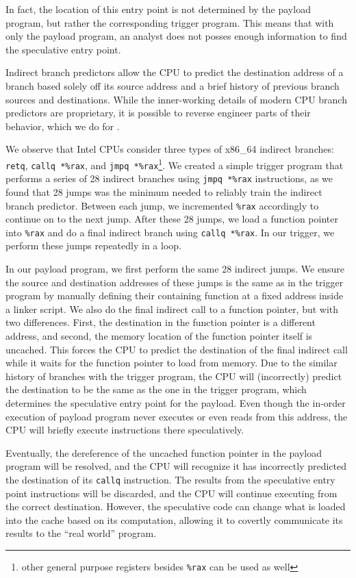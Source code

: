 In fact, the location of this entry point is not determined by the payload
program, but rather the corresponding trigger program. This means that with only
the payload program, an analyst does not posses enough information to find the
speculative entry point.



Indirect branch predictors allow the CPU to predict the destination address of a
branch based solely off its source address and a brief history of previous
branch sources and destinations. While the inner-working details of modern CPU
branch predictors are proprietary, it is possible to reverse engineer parts of
their behavior, which we do for \speculake.

We observe that Intel CPUs consider three types of x86\_64 indirect branches:
\texttt{retq}, \texttt{callq *\%rax}, and \texttt{jmpq *\%rax}\footnote{other
general purpose registers besides \texttt{\%rax} can be used as well}.
We created a simple trigger program that performs a series of 28 indirect
branches
using \texttt{jmpq *\%rax} instructions, as we found that 28 jumps was the minimum
needed to reliably train the indirect branch predictor. 
Between each jump, we incremented
\texttt{\%rax} accordingly to continue on to the next jump. After these 28
jumps, we load a function pointer into \texttt{\%rax} and do a final indirect
branch using \texttt{callq *\%rax}. In our trigger, we perform these jumps
        repeatedly in a loop.

In our payload program, we first perform the same 28 indirect jumps. We ensure
the source and destination addresses of these jumps is the same as in the trigger program by
manually defining their containing function at a fixed address inside a linker
script. We also do the final indirect call to a function pointer, but with two
differences. First, the destination in the function pointer is a different
address, and second, the memory location of the function pointer itself is uncached.
This forces the CPU to predict the destination of the final indirect call while it
waits for the function pointer to load from memory. Due to the similar
history of branches with the trigger program,
the CPU will (incorrectly) predict the destination to be the same as the one in
the trigger program, which determines the speculative entry point for the
payload. Even though the in-order execution of
payload program never executes or even reads from this address, the CPU will
briefly execute instructions there speculatively.

Eventually, the dereference of the uncached function pointer in the payload program
will be resolved, and the CPU will recognize it has incorrectly predicted the
destination of its \texttt{callq} instruction. The
results from the speculative entry point instructions will be discarded, and the
CPU will continue executing from the correct destination. However, the
speculative code can change what is loaded into the cache based on its
computation, allowing it to covertly communicate its results to the ``real world'' program.



